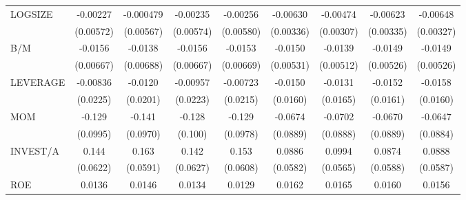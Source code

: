 {\begin{tabular}{l*{8}{c}}
LOGSIZE             &    -0.00227         &   -0.000479         &    -0.00235         &    -0.00256         &    -0.00630\sym{*}  &    -0.00474         &    -0.00623\sym{*}  &    -0.00648\sym{*}  \\
                    &   (0.00572)         &   (0.00567)         &   (0.00574)         &   (0.00580)         &   (0.00336)         &   (0.00307)         &   (0.00335)         &   (0.00327)         \\
B/M                 &     -0.0156\sym{**} &     -0.0138\sym{**} &     -0.0156\sym{**} &     -0.0153\sym{**} &     -0.0150\sym{***}&     -0.0139\sym{***}&     -0.0149\sym{***}&     -0.0149\sym{***}\\
                    &   (0.00667)         &   (0.00688)         &   (0.00667)         &   (0.00669)         &   (0.00531)         &   (0.00512)         &   (0.00526)         &   (0.00526)         \\
LEVERAGE            &    -0.00836         &     -0.0120         &    -0.00957         &    -0.00723         &     -0.0150         &     -0.0131         &     -0.0152         &     -0.0158         \\
                    &    (0.0225)         &    (0.0201)         &    (0.0223)         &    (0.0215)         &    (0.0160)         &    (0.0165)         &    (0.0161)         &    (0.0160)         \\
MOM                 &      -0.129         &      -0.141         &      -0.128         &      -0.129         &     -0.0674         &     -0.0702         &     -0.0670         &     -0.0647         \\
                    &    (0.0995)         &    (0.0970)         &     (0.100)         &    (0.0978)         &    (0.0889)         &    (0.0888)         &    (0.0889)         &    (0.0884)         \\
INVEST/A            &       0.144\sym{**} &       0.163\sym{***}&       0.142\sym{**} &       0.153\sym{**} &      0.0886         &      0.0994\sym{*}  &      0.0874         &      0.0888         \\
                    &    (0.0622)         &    (0.0591)         &    (0.0627)         &    (0.0608)         &    (0.0582)         &    (0.0565)         &    (0.0588)         &    (0.0587)         \\
ROE                 &      0.0136         &      0.0146         &      0.0134         &      0.0129         &      0.0162         &      0.0165         &      0.0160         &      0.0156         \\

\end{tabular}}
